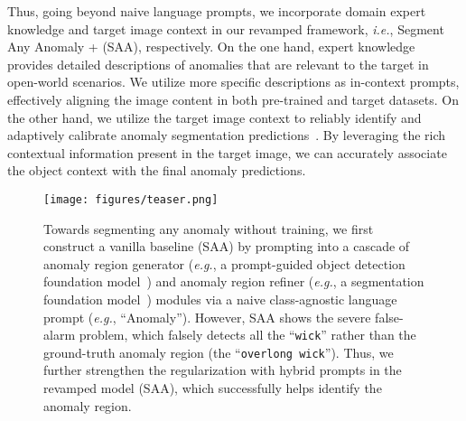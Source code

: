 \documentclass{article}
\begin{document}
Thus, going beyond naive language prompts, we incorporate domain expert knowledge and target image context in our revamped framework, \textit{i.e.}, Segment Any Anomaly + (SAA), respectively.
On the one hand, expert knowledge provides detailed descriptions of anomalies that are relevant to the target in open-world scenarios. We utilize more specific descriptions as in-context prompts, effectively aligning the image content in both pre-trained and target datasets. On the other hand, we utilize the target image context to reliably identify and adaptively calibrate anomaly segmentation predictions~\cite{object_calibration, xu2022reliable}. By leveraging the rich contextual information present in the target image, we can accurately associate the object context with the final anomaly predictions. 

\begin{figure}[t]
  \centering
  \texttt{[image: figures/teaser.png]}
   \vspace{-5mm}
   \caption{Towards segmenting any anomaly without training, we first construct a vanilla baseline (SAA) by prompting into a cascade of anomaly region generator (\textit{e.g.}, a prompt-guided object detection foundation model~\cite{liu2023grounding}) and  anomaly region refiner (\textit{e.g.}, a segmentation foundation model~\cite{kirillov2023segment}) modules via a naive class-agnostic language prompt (\textit{e.g.}, ``Anomaly''). However, SAA shows the severe false-alarm problem, which falsely detects all the ``\texttt{\textcolor[RGB]{207,63,63}{wick}}'' rather than the ground-truth anomaly region (the ``\texttt{\textcolor[RGB]{112,173,71}{overlong wick}}''). Thus, we further strengthen the regularization with hybrid prompts in the revamped model (SAA), which successfully helps identify the anomaly region.}
  \label{fig:teaser}
  \vspace{-1mm}
\end{figure}
\end{document}
